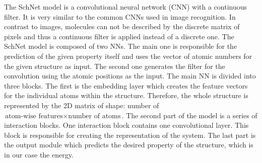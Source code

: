 The SchNet model \cite{Schuett2018SchNet} is a convolutional neural network (CNN) with a continuous filter. It is very similar to the common CNNs used in image recognition. In contrast to images, molecules can not be described by the discrete matrix of pixels and thus a continuous filter is applied instead of a discrete one. The SchNet model is composed of two NNs. The main one is responsible for the prediction of the given property itself and uses the vector of atomic numbers for the given structure as input. The second one generates the filter for the convolution using the atomic positions as the input. The main NN is divided into three blocks. The first is the embedding layer which creates the feature vectors for the individual atoms within the structure. Therefore, the whole structure is represented by the 2D matrix of shape: number of $\text{atom-wise features}\times \text{number of atoms}$. The second part of the model is a series of interaction blocks. One interaction block contains one convolutional layer. This block is responsible for creating the representation of the system. The last part is the output module which predicts the desired property of the structure, which is in our case the energy.

